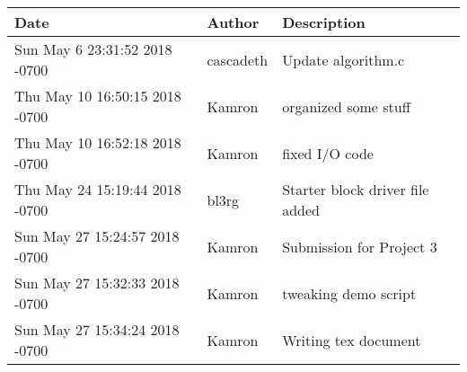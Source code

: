 \begin{tabular}{l l l}\textbf{Date} & \textbf{Author} & \textbf{Description}\\\hline
Sun May 6 23:31:52 2018 -0700 & cascadeth & Update algorithm.c\\\hline
Thu May 10 16:50:15 2018 -0700 & Kamron & organized some stuff\\\hline
Thu May 10 16:52:18 2018 -0700 & Kamron & fixed I/O code\\\hline
Thu May 24 15:19:44 2018 -0700 & bl3rg & Starter block driver file added\\\hline
Sun May 27 15:24:57 2018 -0700 & Kamron & Submission for Project 3\\\hline
Sun May 27 15:32:33 2018 -0700 & Kamron & tweaking demo script\\\hline
Sun May 27 15:34:24 2018 -0700 & Kamron & Writing tex document\\\hline\end{tabular}
